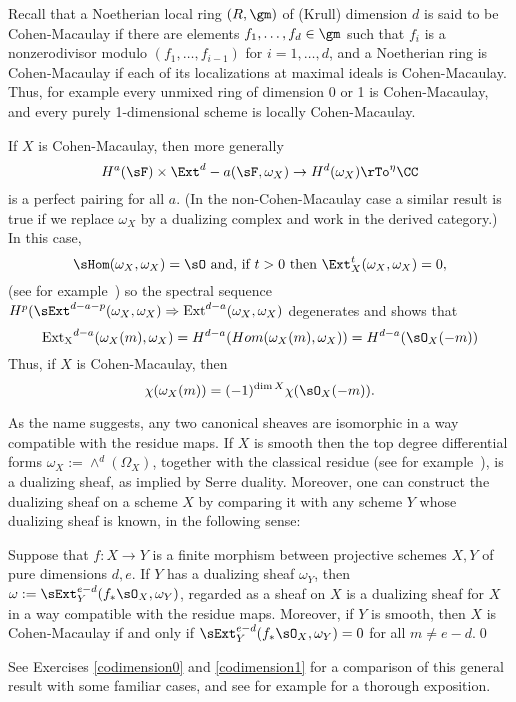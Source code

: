 \begin{fact}
Recall that a Noetherian local ring $(R,\gm)$ of (Krull) dimension $d$ is said to be Cohen-Macaulay if there are elements $f_1,\dots,f_d\in \gm$ such that
$f_i$ is a nonzerodivisor modulo $(f_1,\dots,f_{i-1})$ for $i =1,\dots,d$, and a Noetherian ring is Cohen-Macaulay if each of its localizations at maximal ideals
is Cohen-Macaulay. Thus, for example every unmixed ring of dimension 0 or 1 is Cohen-Macaulay, and every purely 1-dimensional scheme is locally Cohen-Macaulay. 

If $X$ is Cohen-Macaulay, then more generally
$$
H^a(\sF) \times \Ext^d-a(\sF, \omega_X) \to H^d(\omega_X) \rTo^\eta \CC
$$
is a perfect pairing for all $a$. (In the non-Cohen-Macaulay case a similar result is true if we replace $\omega_X$ by a dualizing complex
and work in the derived category.) In this case, 
$$
\sHom(\omega_X, \omega_X) = \sO \hbox{ and, if $t>0$ then } \Ext_X^{t}(\omega_X, \omega_X) = 0,
$$
(see for example~\cite[Theorem[Theorems 3.3.4 and 3.3.10d]{BrunsHerzog}) so the spectral sequence $H^p(\sExt^{d-a-p}(\omega_X, \omega_X) \Rightarrow {\rm Ext}^{d-a}(\omega_X, \omega_X)$ degenerates and shows that 
$$
{\rm Ext_X}^{d-a}(\omega_X(m), \omega_X) = H^{d-a}(Hom(\omega_X(m), \omega_X)) = H^{d-a}(\sO_X(-m))
$$
Thus, if $X$ is Cohen-Macaulay, then 
$$
\chi(\omega_X(m)) =(-1)^{\dim X}\chi(\sO_X(-m)).
$$

As the name suggests, any two canonical sheaves are isomorphic in a way compatible with the
residue maps. If $X$ is smooth then the top degree differential forms $\omega_X :=\wedge^d(\Omega_X)$,
together with the classical residue (see for example~\cite[p. 648, 708]{Griffiths-Harris1978}), is a dualizing sheaf, as implied by Serre duality. Moreover, one can construct the dualizing sheaf on a scheme
$X$ by comparing it with any scheme $Y$ whose dualizing sheaf is known, in the following sense:

\begin{theorem}\label{omega}\label{general adjunction}
Suppose that $f: X\to Y$ is a finite morphism between projective schemes $X,Y$ of pure dimensions $d,e$. If $Y$ has a dualizing sheaf $\omega_Y$,
then $\omega := \sExt_Y^{e-d}(f_*\sO_X,  \omega_Y)$, regarded as a sheaf on $X$ is a dualizing sheaf for $X$ in a way compatible with the residue maps.
Moreover, if $Y$ is smooth, then $X$ is Cohen-Macaulay if and only if $ \sExt_Y^{e-d}(f_*\sO_X,  \omega_Y)= 0$ for all $m\neq e-d$.\qed
\end{theorem}

See Exercises \ref{codimension0} and \ref{codimension1} for a comparison of this general result with some
familiar cases, and see for example \cite{AltmanKleiman} for a thorough exposition.
\end{fact}



